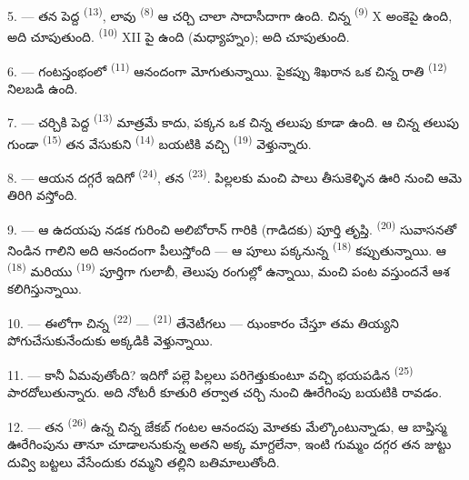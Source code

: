 \VUsaut{3.4mm}
\VUsaut{3.0mm}

5. --- తన పెద్ద  \textsuperscript{(13)}, లావు 
\textsuperscript{(8)} ఆ చర్చి చాలా సాదాసీదాగా ఉంది. చిన్న 
\textsuperscript{(9)} X అంకెపై ఉంది, అది  చూపుతుంది. 
\textsuperscript{(10)} XII పై ఉంది (మధ్యాహ్నం); అది  చూపుతుంది.

6. --- గంటస్తంభంలో  \textsuperscript{(11)} ఆనందంగా మోగుతున్నాయి. పైకప్పు శిఖరాన
ఒక చిన్న రాతి  \textsuperscript{(12)} నిలబడి ఉంది.

7. --- చర్చికి పెద్ద  \textsuperscript{(13)} మాత్రమే కాదు, పక్కన ఒక
చిన్న తలుపు కూడా ఉంది. ఆ చిన్న తలుపు గుండా  \textsuperscript{(15)} తన
 వేసుకుని  \textsuperscript{(14)} బయటికి వచ్చి
 \textsuperscript{(19)} వెళ్తున్నారు.

8. --- ఆయన దగ్గరే ఇదిగో  \textsuperscript{(24)}, తన 
\textsuperscript{(23)}. పిల్లలకు మంచి పాలు తీసుకెళ్ళిన ఊరి నుంచి ఆమె తిరిగి వస్తోంది.

\VUsaut{4.0mm}
\VUsaut{3.4mm}

9. --- ఆ ఉదయపు నడక గురించి అలిబోరాన్ గారికి (గాడిదకు) పూర్తి తృప్తి. 
\textsuperscript{(20)} సువాసనతో నిండిన గాలిని అది ఆనందంగా పీలుస్తోంది — ఆ పూలు పక్కనున్న
  \textsuperscript{(18)} కప్పుతున్నాయి. ఆ
 \textsuperscript{(18)} మరియు 
\textsuperscript{(19)} పూర్తిగా గులాబీ, తెలుపు రంగుల్లో ఉన్నాయి, మంచి పంట వస్తుందనే ఆశ
కలిగిస్తున్నాయి.

10. --- ఈలోగా చిన్న  \textsuperscript{(22)} — 
\textsuperscript{(21)} తేనెటీగలు — ఝంకారం చేస్తూ తమ తియ్యని  పోగుచేసుకునేందుకు
అక్కడికి వెళ్తున్నాయి.

11. --- కానీ ఏమవుతోంది? ఇదిగో పల్లె పిల్లలు పరిగెత్తుకుంటూ వచ్చి భయపడిన 
\textsuperscript{(25)} పారదోలుతున్నారు. అది నోటరీ కూతురి  తర్వాత చర్చి
నుంచి ఊరేగింపు బయటికి రావడం.

12. --- తన  \textsuperscript{(26)} ఉన్న చిన్న జేకబ్ గంటల ఆనందపు మోతకు
మేల్కొంటున్నాడు, ఆ బాప్తిస్మ ఊరేగింపును తానూ చూడాలనుకున్న అతని అక్క మాగ్దలేనా, ఇంటి గుమ్మం
దగ్గర తన జుట్టు దువ్వి బట్టలు వేసేందుకు రమ్మని తల్లిని బతిమాలుతోంది.

